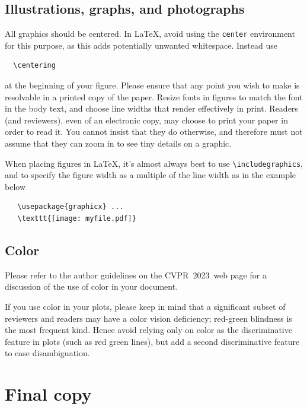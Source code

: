 \documentclass[10pt,twocolumn,letterpaper]{article}
\def\confName{CVPR}
\def\confYear{2023}
\begin{document}
\subsection{Illustrations, graphs, and photographs}

All graphics should be centered.
In \LaTeX, avoid using the \texttt{center} environment for this purpose, as this adds potentially unwanted whitespace.
Instead use
{\small\begin{verbatim}
  \centering
\end{verbatim}}
at the beginning of your figure.
Please ensure that any point you wish to make is resolvable in a printed copy of the paper.
Resize fonts in figures to match the font in the body text, and choose line widths that render effectively in print.
Readers (and reviewers), even of an electronic copy, may choose to print your paper in order to read it.
You cannot insist that they do otherwise, and therefore must not assume that they can zoom in to see tiny details on a graphic.

When placing figures in \LaTeX, it's almost always best to use \verb+\includegraphics+, and to specify the figure width as a multiple of the line width as in the example below
{\small\begin{verbatim}
   \usepackage{graphicx} ...
   \texttt{[image: myfile.pdf]}
\end{verbatim}
}


\subsection{Color}

Please refer to the author guidelines on the \confName\ \confYear\ web page for a discussion of the use of color in your document.

If you use color in your plots, please keep in mind that a significant subset of reviewers and readers may have a color vision deficiency; red-green blindness is the most frequent kind.
Hence avoid relying only on color as the discriminative feature in plots (such as red \vs green lines), but add a second discriminative feature to ease disambiguation.

\section{Final copy}
\end{document}
